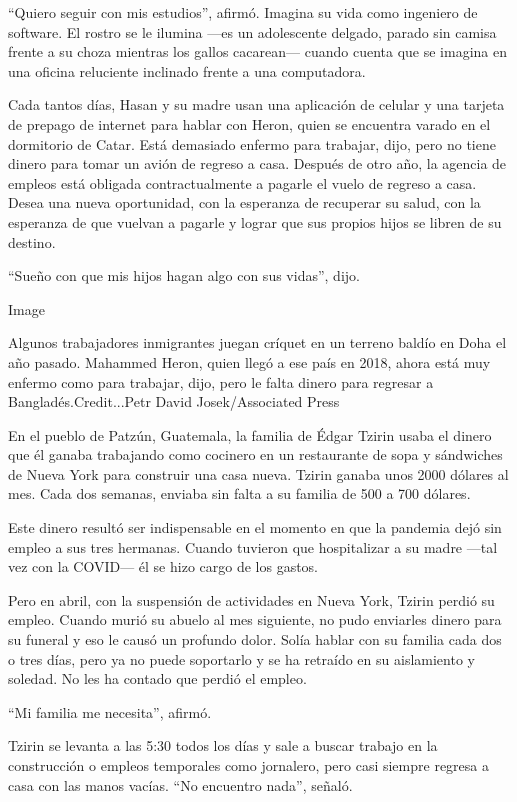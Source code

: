 ``Quiero seguir con mis estudios'', afirmó. Imagina su vida como
ingeniero de software. El rostro se le ilumina ---es un adolescente
delgado, parado sin camisa frente a su choza mientras los gallos
cacarean--- cuando cuenta que se imagina en una oficina reluciente
inclinado frente a una computadora.

Cada tantos días, Hasan y su madre usan una aplicación de celular y una
tarjeta de prepago de internet para hablar con Heron, quien se encuentra
varado en el dormitorio de Catar. Está demasiado enfermo para trabajar,
dijo, pero no tiene dinero para tomar un avión de regreso a casa.
Después de otro año, la agencia de empleos está obligada
contractualmente a pagarle el vuelo de regreso a casa. Desea una nueva
oportunidad, con la esperanza de recuperar su salud, con la esperanza de
que vuelvan a pagarle y lograr que sus propios hijos se libren de su
destino.

``Sueño con que mis hijos hagan algo con sus vidas'', dijo.

Image

Algunos trabajadores inmigrantes juegan críquet en un terreno baldío en
Doha el año pasado. Mahammed Heron, quien llegó a ese país en 2018,
ahora está muy enfermo como para trabajar, dijo, pero le falta dinero
para regresar a Bangladés.Credit...Petr David Josek/Associated Press

En el pueblo de Patzún, Guatemala, la familia de Édgar Tzirin usaba el
dinero que él ganaba trabajando como cocinero en un restaurante de sopa
y sándwiches de Nueva York para construir una casa nueva. Tzirin ganaba
unos 2000 dólares al mes. Cada dos semanas, enviaba sin falta a su
familia de 500 a 700 dólares.

Este dinero resultó ser indispensable en el momento en que la pandemia
dejó sin empleo a sus tres hermanas. Cuando tuvieron que hospitalizar a
su madre ---tal vez con la COVID--- él se hizo cargo de los gastos.

Pero en abril, con la suspensión de actividades en Nueva York, Tzirin
perdió su empleo. Cuando murió su abuelo al mes siguiente, no pudo
enviarles dinero para su funeral y eso le causó un profundo dolor. Solía
hablar con su familia cada dos o tres días, pero ya no puede soportarlo
y se ha retraído en su aislamiento y soledad. No les ha contado que
perdió el empleo.

``Mi familia me necesita'', afirmó.

Tzirin se levanta a las 5:30 todos los días y sale a buscar trabajo en
la construcción o empleos temporales como jornalero, pero casi siempre
regresa a casa con las manos vacías. ``No encuentro nada'', señaló.

